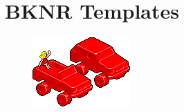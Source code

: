 \chapter{BKNR Templates}

\begin{figure}[htbp]
    \centering
\includegraphics{templatesicon}
\end{figure}

